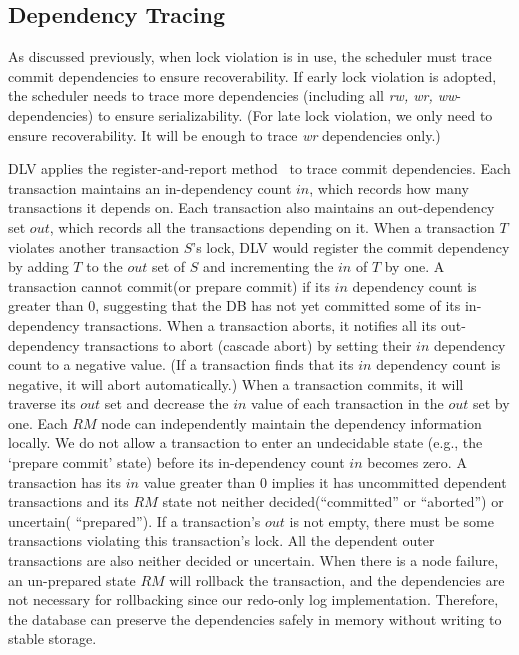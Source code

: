 \documentclass[conference]{IEEEtran}
\begin{document}
\subsection{Dependency Tracing}
As discussed previously, when lock violation is in use,
the scheduler must trace commit dependencies to ensure recoverability.
If early lock violation is adopted, the scheduler needs to trace more dependencies (including all \emph{rw, wr, ww}-dependencies) to ensure serializability.
(For late lock violation, we only need to ensure recoverability.
It will be enough to trace \emph{wr} dependencies only.)

DLV applies the register-and-report method~\cite{HeckatonMVCC:journals/pvldb/LarsonBDFPZ11} to trace commit dependencies.
Each transaction maintains an in-dependency count ${in}$, which records how many transactions it depends on.
Each transaction also maintains an out-dependency set  ${out}$, which records all the transactions depending on it.
When a transaction ${T}$ violates another transaction ${S}$'s lock,
DLV would register the commit dependency by adding ${T}$ to the ${out}$ set of ${S}$ and incrementing the ${in}$ of ${T}$ by one.
A transaction cannot commit(or prepare commit) if its ${in}$ dependency count is greater than 0, suggesting that the DB has not yet committed some of its in-dependency transactions.
When a transaction aborts, it notifies all its out-dependency transactions to abort (cascade abort) by setting their ${in}$ dependency count to a negative value.
(If a transaction finds that its ${in}$ dependency count is negative, it will abort automatically.)
When a transaction commits, it will traverse its ${out}$ set and decrease the ${in}$ value of each transaction in the ${out}$ set by one.
Each $RM$ node can independently maintain the dependency information locally.
We do not allow a transaction to enter an undecidable state (e.g., the `prepare commit' state) before its in-dependency count ${in}$ becomes zero.
A transaction has its ${in}$ value greater than 0 implies it has uncommitted dependent transactions and its ${RM}$ state not neither decided(``committed'' or    ``aborted'')
or uncertain( ``prepared'').
If a transaction's ${out}$ is not empty, there must be some transactions violating this transaction's lock.
All the dependent outer transactions are also neither decided 
or uncertain.
When there is a node failure, an un-prepared state $ RM$ will rollback the transaction, and the dependencies are not necessary for rollbacking since our redo-only log implementation.
Therefore, the database can preserve the dependencies safely in memory without writing to stable storage.
\end{document}
